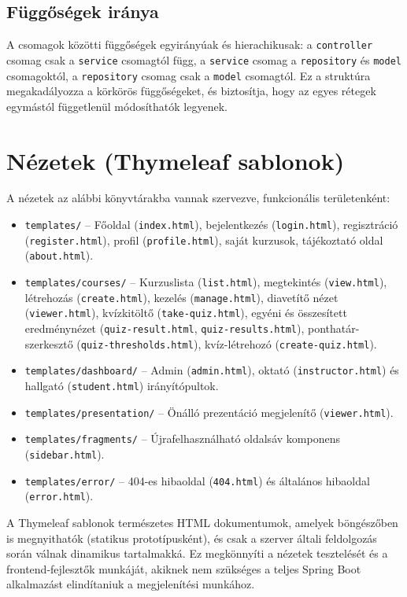 \subsection{Függőségek iránya}

A csomagok közötti függőségek egyirányúak és hierachikusak: a \texttt{controller} csomag csak a \texttt{service} csomagtól függ, a \texttt{service} csomag a \texttt{repository} és \texttt{model} csomagoktól, a \texttt{repository} csomag csak a \texttt{model} csomagtól. Ez a struktúra megakadályozza a körkörös függőségeket, és biztosítja, hogy az egyes rétegek egymástól függetlenül módosíthatók legyenek.

\section{Nézetek (Thymeleaf sablonok)}

A nézetek az alábbi könyvtárakba vannak szervezve, funkcionális területenként:

\begin{sloppypar}
\begin{itemize}
    \item \texttt{templates/} – Főoldal (\texttt{index.html}), bejelentkezés (\texttt{login.html}), regisztráció (\texttt{register.html}), profil (\texttt{profile.html}), saját kurzusok, tájékoztató oldal (\texttt{about.html}).
    \item \texttt{templates/courses/} – Kurzuslista (\texttt{list.html}), megtekintés (\texttt{view.html}), létrehozás (\texttt{create.html}), kezelés (\texttt{manage.html}), diavetítő nézet (\texttt{viewer.html}), kvízkitöltő (\texttt{take-quiz.html}), egyéni és összesített eredménynézet (\texttt{quiz-result.html}, \texttt{quiz-results.html}), ponthatár-szerkesztő (\texttt{quiz-thresholds.html}), kvíz-létrehozó (\texttt{create-quiz.html}).
    \item \texttt{templates/dashboard/} – Admin (\texttt{admin.html}), oktató (\texttt{instructor.html}) és hallgató (\texttt{student.html}) irányítópultok.
    \item \texttt{templates/presentation/} – Önálló prezentáció megjelenítő (\texttt{viewer.html}).
    \item \texttt{templates/fragments/} – Újrafelhasználható oldalsáv komponens (\texttt{sidebar.html}).
    \item \texttt{templates/error/} – 404-es hibaoldal (\texttt{404.html}) és általános hibaoldal (\texttt{error.html}).
\end{itemize}
\end{sloppypar}

A Thymeleaf sablonok természetes HTML dokumentumok, amelyek böngészőben is megnyithatók (statikus prototípusként), és csak a szerver általi feldolgozás során válnak dinamikus tartalmakká. Ez megkönnyíti a nézetek tesztelését és a frontend-fejlesztők munkáját, akiknek nem szükséges a teljes Spring Boot alkalmazást elindítaniuk a megjelenítési munkához.
